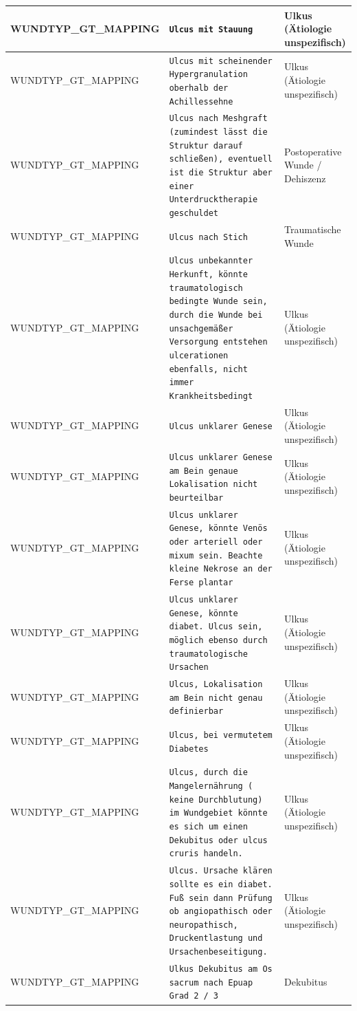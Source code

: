 \begin{longtable}{|p{3.5cm}|p{5cm}|p{6.5cm}|}
WUNDTYP\_GT\_MAPPING & \texttt{Ulcus mit Stauung} & Ulkus (Ätiologie unspezifisch) \\ \hline
WUNDTYP\_GT\_MAPPING & \texttt{Ulcus mit scheinender Hypergranulation oberhalb der Achillessehne} & Ulkus (Ätiologie unspezifisch) \\ \hline
WUNDTYP\_GT\_MAPPING & \texttt{Ulcus nach Meshgraft (zumindest lässt die Struktur darauf schließen), eventuell ist die Struktur aber einer Unterdrucktherapie geschuldet} & Postoperative Wunde / Dehiszenz \\ \hline
WUNDTYP\_GT\_MAPPING & \texttt{Ulcus nach Stich} & Traumatische Wunde \\ \hline
WUNDTYP\_GT\_MAPPING & \texttt{Ulcus unbekannter Herkunft, könnte traumatologisch bedingte Wunde sein, durch die Wunde bei unsachgemäßer Versorgung entstehen ulcerationen ebenfalls, nicht immer Krankheitsbedingt} & Ulkus (Ätiologie unspezifisch) \\ \hline
WUNDTYP\_GT\_MAPPING & \texttt{Ulcus unklarer Genese} & Ulkus (Ätiologie unspezifisch) \\ \hline
WUNDTYP\_GT\_MAPPING & \texttt{Ulcus unklarer Genese am Bein genaue Lokalisation nicht beurteilbar} & Ulkus (Ätiologie unspezifisch) \\ \hline
WUNDTYP\_GT\_MAPPING & \texttt{Ulcus unklarer Genese, könnte Venös oder arteriell oder mixum sein.
Beachte kleine Nekrose an der Ferse plantar} & Ulkus (Ätiologie unspezifisch) \\ \hline
WUNDTYP\_GT\_MAPPING & \texttt{Ulcus unklarer Genese, könnte diabet. Ulcus sein, möglich ebenso durch traumatologische Ursachen} & Ulkus (Ätiologie unspezifisch) \\ \hline
WUNDTYP\_GT\_MAPPING & \texttt{Ulcus, Lokalisation am Bein nicht genau definierbar} & Ulkus (Ätiologie unspezifisch) \\ \hline
WUNDTYP\_GT\_MAPPING & \texttt{Ulcus, bei vermutetem Diabetes} & Ulkus (Ätiologie unspezifisch) \\ \hline
WUNDTYP\_GT\_MAPPING & \texttt{Ulcus, durch die Mangelernährung ( keine Durchblutung) im Wundgebiet  könnte es sich um einen Dekubitus oder ulcus cruris handeln.} & Ulkus (Ätiologie unspezifisch) \\ \hline
WUNDTYP\_GT\_MAPPING & \texttt{Ulcus. Ursache klären sollte es ein diabet. Fuß sein dann Prüfung ob angiopathisch oder neuropathisch,
Druckentlastung und Ursachenbeseitigung.} & Ulkus (Ätiologie unspezifisch) \\ \hline
WUNDTYP\_GT\_MAPPING & \texttt{Ulkus Dekubitus am Os sacrum  nach Epuap Grad 2 / 3} & Dekubitus \\ \hline

\end{longtable}
